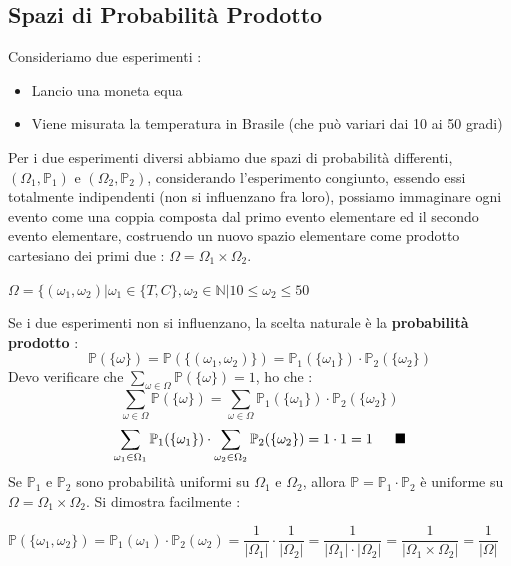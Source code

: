 \documentclass[12pt, letterpaper]{article}
\begin{document}
\subsection{Spazi di Probabilità Prodotto}
Consideriamo due esperimenti : \begin{itemize}
    \item Lancio una moneta equa 
    \item Viene misurata la temperatura in Brasile (che può variari dai 10 ai 50 gradi)
\end{itemize}
Per i due esperimenti diversi abbiamo due spazi di probabilità differenti, \((\Omega_1,\mathbb{P}_1)\) e 
\((\Omega_2,\mathbb{P}_2)\), considerando l'esperimento congiunto, essendo essi totalmente indipendenti (non si 
influenzano fra loro), possiamo immaginare ogni evento come una coppia composta dal primo evento elementare ed 
il secondo evento elementare, costruendo un nuovo spazio elementare come prodotto cartesiano
dei primi due : \(\Omega=\Omega_1\times\Omega_2\).\begin{center}
    \( \Omega=\{(\omega_1,\omega_2)|\omega_1\in\{T,C\}, \omega_2\in \mathbb{N} | 10\le\omega_2\le50 \)
\end{center}
Se i due esperimenti non si influenzano, la scelta naturale è la \textbf{probabilità prodotto} :
\begin{equation}
    \mathbb{P}(\{\omega\})=\mathbb{P}(\{(\omega_1,\omega_2)\})=\mathbb{P}_1(\{\omega_1\})\cdot\mathbb{P}_2(\{\omega_2\})
\end{equation}
Devo verificare che \(\displaystyle\sum_{\omega \in \Omega}\mathbb{P}(\{\omega\})=1\), ho che :
\begin{equation}
    \sum_{\omega \in \Omega}\mathbb{P}(\{\omega\})=\sum_{\omega \in \Omega}\mathbb{P}_1(\{\omega_1\})\cdot\mathbb{P}_2(\{\omega_2\})
\end{equation}
\begin{equation}
    \sum_{\omega_1 \in \Omega_1}\mathbb{P}_1(\{\omega_1\})\cdot \sum_{\omega_2 \in \Omega_2}\mathbb{P}_2(\{\omega_2\})=1\cdot1=1 \hphantom{aaa}\blacksquare
\end{equation}
Se \(\mathbb{P}_1\) e \(\mathbb{P}_2\) sono probabilità uniformi su \(\Omega_1\) e \(\Omega_2\), allora 
\(\mathbb{P}=\mathbb{P}_1\cdot\mathbb{P}_2\) è uniforme su \(\Omega=\Omega_1\times \Omega_2\). Si dimostra 
facilmente :\begin{center}
    \(
        \mathbb{P}(\{\omega_1,\omega_2\})=\mathbb{P}_1(\omega_1)\cdot\mathbb{P}_2(\omega_2)=\dfrac{1}{|\Omega_1|}\cdot\dfrac{1}{|\Omega_2|}=
        \dfrac{1}{|\Omega_1|\cdot |\Omega_2|}=\dfrac{1}{|\Omega_1\times\Omega_2|}=\dfrac{1}{|\Omega|}
    \)
\end{center}
\end{document}
